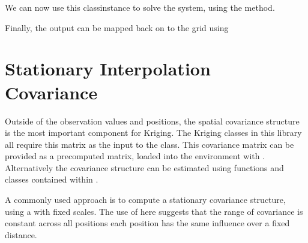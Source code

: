 \documentclass[letterpaper,10pt,english]{sphinxmanual}
\begin{document}
\sphinxAtStartPar
We can now use this class\sphinxhyphen{}instance to solve the system, using the  method.

\begin{sphinxVerbatim}[commandchars=\\\{\}]
  
\end{sphinxVerbatim}

\sphinxAtStartPar
Finally, the output can be mapped back on to the grid using
{\hyperref[\detokenize{kriging:glomar_gridding.grid.assign_to_grid}]{}}

\begin{sphinxVerbatim}[commandchars=\\\{\}]
  
\end{sphinxVerbatim}

\sphinxstepscope


\chapter{Stationary Interpolation Covariance}
\label{\detokenize{covariance:stationary-interpolation-covariance}}\label{\detokenize{covariance::doc}}
\sphinxAtStartPar
Outside of the observation values and positions, the spatial covariance structure is the most
important component for Kriging. The Kriging classes in this library all require this matrix as the
input to the class. This covariance matrix can be provided as a pre\sphinxhyphen{}computed matrix, loaded into the
environment with {\hyperref[\detokenize{covariance:glomar_gridding.interpolation_covariance.load_covariance}]{}}. Alternatively
the covariance structure can be estimated using functions and classes contained within
.

\sphinxAtStartPar
A commonly used approach is to compute a stationary covariance structure, using a  with
fixed scales. The use of  here suggests that the range of covariance is constant across
all positions \sphinxhyphen{} each position has the same influence over a fixed distance.
\end{document}
